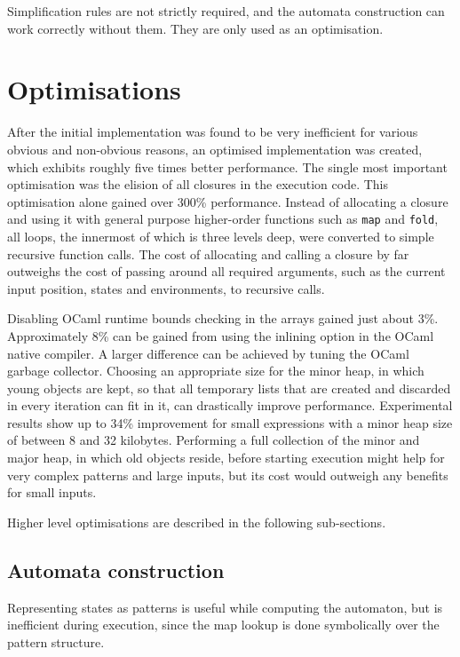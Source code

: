 Simplification rules are not strictly required, and the  automata construction
can work correctly without them. They are only used as an optimisation.


\section{Optimisations}
\label{opts}

After the initial implementation was found to be very inefficient for various
obvious and non-obvious reasons, an optimised implementation was created, which
exhibits roughly five times better performance. The single most important
optimisation was the elision of all closures in the execution code. This
optimisation alone gained over 300\% performance. Instead of allocating a
closure and using it with general purpose higher-order functions such as
\texttt{map} and \texttt{fold}, all loops, the innermost of which is three
levels deep, were converted to simple recursive function calls. The cost of
allocating and calling a closure by far outweighs the cost of passing around all
required arguments, such as the current input position, states and
environments, to recursive calls.

Disabling OCaml runtime bounds checking in the arrays gained just about 3\%.
Approximately 8\% can be gained from using the inlining option in the OCaml
native compiler. A larger difference can be achieved by tuning the OCaml garbage
collector. Choosing an appropriate size for the minor heap, in which young
objects are kept, so that all temporary lists that are created and discarded in
every iteration can fit in it, can drastically improve performance. Experimental
results show up to 34\% improvement for small expressions with a minor heap size
of between 8 and 32 kilobytes. Performing a full collection of the minor and
major heap, in which old objects reside, before starting execution might help
for very complex patterns and large inputs, but its cost would outweigh any
benefits for small inputs.

Higher level optimisations are described in the following sub-sections.


\subsection{Automata construction}

Representing states as patterns is useful while computing the automaton, but is
inefficient during execution, since the map lookup is done symbolically over the
pattern structure.

